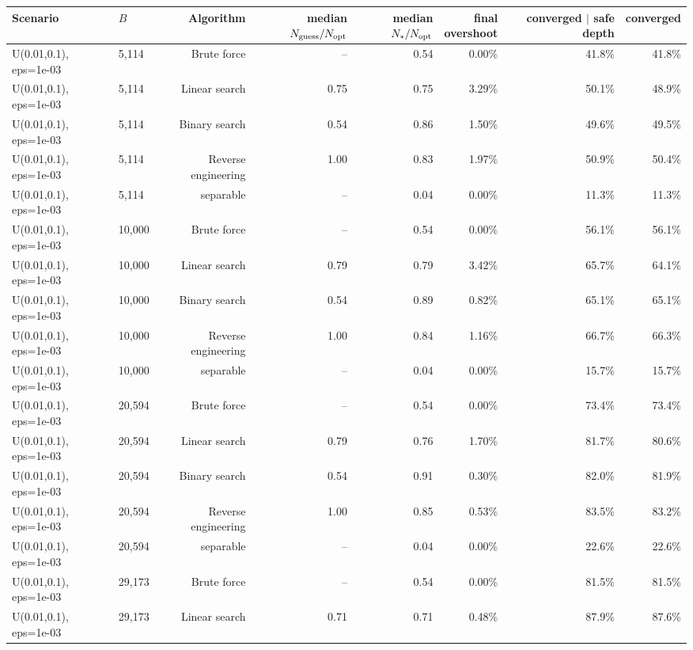 \begin{tabular}{llrrrrrr}
\toprule
Scenario & $B$ & Algorithm & \makecell{median\\$N_{\rm guess}/N_{\rm opt}$} & \makecell{median\\$N_*/N_{\rm opt}$} & \makecell{final\\overshoot} & \makecell{converged\\$\mid$ safe depth} & converged \\
\midrule
U(0.01,0.1), eps=1e-03 & 5,114 & Brute force & -- & 0.54 & 0.00\% & 41.8\% & 41.8\% \\
U(0.01,0.1), eps=1e-03 & 5,114 & Linear search & 0.75 & 0.75 & 3.29\% & 50.1\% & 48.9\% \\
U(0.01,0.1), eps=1e-03 & 5,114 & Binary search & 0.54 & 0.86 & 1.50\% & 49.6\% & 49.5\% \\
U(0.01,0.1), eps=1e-03 & 5,114 & Reverse engineering & 1.00 & 0.83 & 1.97\% & 50.9\% & 50.4\% \\
U(0.01,0.1), eps=1e-03 & 5,114 & separable & -- & 0.04 & 0.00\% & 11.3\% & 11.3\% \\
U(0.01,0.1), eps=1e-03 & 10,000 & Brute force & -- & 0.54 & 0.00\% & 56.1\% & 56.1\% \\
U(0.01,0.1), eps=1e-03 & 10,000 & Linear search & 0.79 & 0.79 & 3.42\% & 65.7\% & 64.1\% \\
U(0.01,0.1), eps=1e-03 & 10,000 & Binary search & 0.54 & 0.89 & 0.82\% & 65.1\% & 65.1\% \\
U(0.01,0.1), eps=1e-03 & 10,000 & Reverse engineering & 1.00 & 0.84 & 1.16\% & 66.7\% & 66.3\% \\
U(0.01,0.1), eps=1e-03 & 10,000 & separable & -- & 0.04 & 0.00\% & 15.7\% & 15.7\% \\
U(0.01,0.1), eps=1e-03 & 20,594 & Brute force & -- & 0.54 & 0.00\% & 73.4\% & 73.4\% \\
U(0.01,0.1), eps=1e-03 & 20,594 & Linear search & 0.79 & 0.76 & 1.70\% & 81.7\% & 80.6\% \\
U(0.01,0.1), eps=1e-03 & 20,594 & Binary search & 0.54 & 0.91 & 0.30\% & 82.0\% & 81.9\% \\
U(0.01,0.1), eps=1e-03 & 20,594 & Reverse engineering & 1.00 & 0.85 & 0.53\% & 83.5\% & 83.2\% \\
U(0.01,0.1), eps=1e-03 & 20,594 & separable & -- & 0.04 & 0.00\% & 22.6\% & 22.6\% \\
U(0.01,0.1), eps=1e-03 & 29,173 & Brute force & -- & 0.54 & 0.00\% & 81.5\% & 81.5\% \\
U(0.01,0.1), eps=1e-03 & 29,173 & Linear search & 0.71 & 0.71 & 0.48\% & 87.9\% & 87.6\% \\

\end{tabular}

